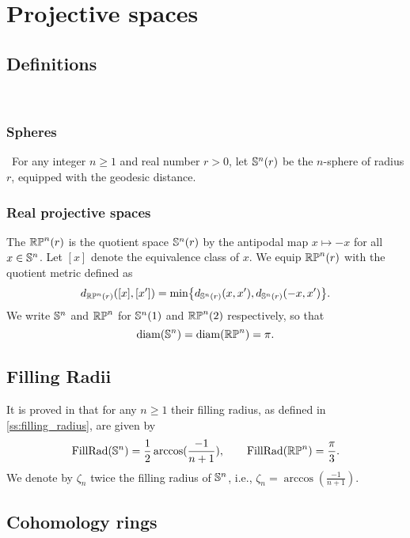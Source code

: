 
\section{Projective spaces}


\subsection{Definitions} \

\subsubsection{Spheres} \
For any integer $n \geq 1$ and real number $r > 0$, let $\bS^n(r)$ be the $n$-sphere of radius $r$, equipped with the geodesic distance.

\subsubsection{Real projective spaces}
The  $\rp^n(r)$ is the quotient space $\bS^n(r)$ by the antipodal map $x \mapsto -x$ for all $x \in \bS^n$.
Let $[x]$ denote the equivalence class of $x$.
We equip $\rp^n(r)$ with the quotient metric defined as
\[
d_{\rp^n(r)}([x],[x']) =
\min\set[\big]{d_{\bS^n(r)}(x, x'), d_{\bS^n(r)}(-x, x')}.
\]
We write $\bS^n$ and $\rp^n$ for $\bS^n(1)$ and $\rp^n(2)$ respectively, so that
\[
\diam(\bS^n) = \diam(\rp^n) = \pi.
\] 

\subsection{Filling Radii}

It is proved in \cite{katz1983filling} that for any $n \geq 1$ their filling radius, as defined in \cref{ss:filling_radius}, are given by
\[
\fillrad{\bS^n} = \frac{1}{2}\arccos(\frac{-1}{n+1}), \qquad
\fillrad{\rp^n} = \frac{\pi}{3}.
\]
We denote by $\zeta_n$ twice the filling radius of $\bS^n$, i.e., $\zeta_n = \arccos(\frac{-1}{n+1})$.

\subsection{Cohomology rings}